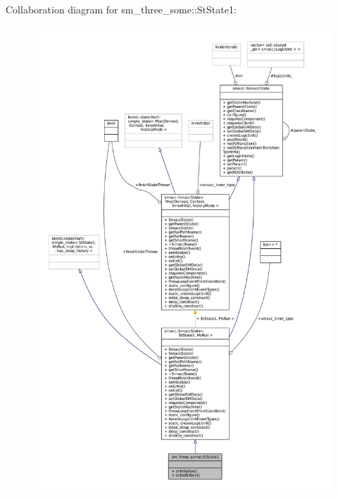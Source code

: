 Collaboration diagram for sm\+\_\+three\+\_\+some\+:\+:St\+State1\+:
\nopagebreak
\begin{figure}[H]
\begin{center}
\leavevmode
\includegraphics[width=350pt]{structsm__three__some_1_1StState1__coll__graph}
\end{center}
\end{figure}
